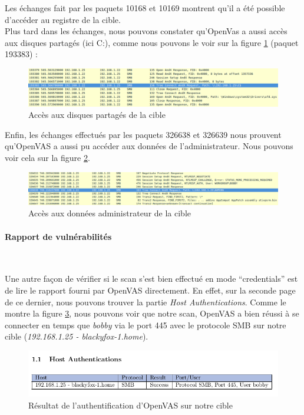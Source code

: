Les échanges fait par les paquets 10168 et 10169 montrent qu'il a été possible d'accéder au registre de la cible.\\
Plus tard dans les échanges, nous pouvons constater qu'OpenVas a aussi accès aux disques partagés (ici C:), comme nous pouvons le voir sur la figure \ref{fig:3} (paquet 193383) :
\begin{figure}[H]
    \centering
    \includegraphics[width=\textwidth]{img/ws3.png}
    \caption{Accès aux disques partagés de la cible}
    \label{fig:3}
\end{figure}
Enfin, les échanges effectués par les paquets 326638 et 326639 nous prouvent qu'OpenVAS a aussi pu accéder aux données de l'administrateur. Nous pouvons voir cela sur la figure \ref{fig:5}.
\begin{figure}[H]
    \centering
    \includegraphics[width=\textwidth]{img/ws4.png}
    \caption{Accès aux données administrateur de la cible}
    \label{fig:5}
\end{figure}
\paragraph{Rapport de vulnérabilités}~\\\par
Une autre façon de vérifier si le scan s'est bien effectué en mode \enquote{credentials} est de lire le rapport fourni par OpenVAS directement. En effet, sur la seconde page de ce dernier, nous pouvons trouver la partie \textit{Host Authentications}. Comme le montre la figure \ref{fig:4}, nous pouvons voir que notre scan, OpenVAS a bien réussi à se connecter en temps que \textit{bobby} via le port 445 avec le protocole SMB sur notre cible (\textit{192.168.1.25 - blackyfox-1.home}).
\begin{figure}[H]
    \centering
    \includegraphics[width=\textwidth]{img/rep1.png}
    \caption{Résultat de l'authentification d'OpenVAS sur notre cible}
    \label{fig:4}
\end{figure}


